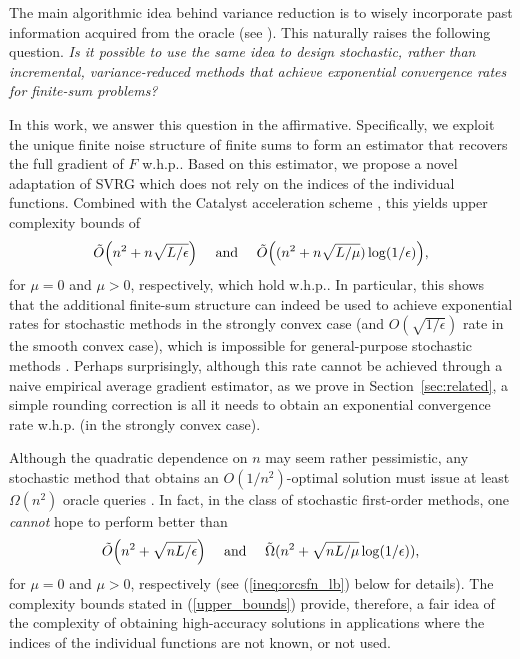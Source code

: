 \documentclass{article}
\theoremstyle{definition}  \newtheorem{exercise}{Exercise}
\theoremstyle{plain}
\DeclarePairedDelimiter{\prn}{(}{)}
\newcommand{\strcvx}{\mu} \newcommand{\query}{B}
\theoremstyle{definition}
\theoremstyle{remark}
\begin{document}
	The main algorithmic idea behind variance reduction is to wisely 
	incorporate past information acquired from the oracle (see 
	\cite{johnson2013accelerating}). This naturally raises the following 
	question. \emph{Is it possible to use the same idea to design stochastic,
	rather than incremental, variance-reduced methods that achieve 
	exponential convergence rates for finite-sum problems? }
	
	In this work, we answer this question in the affirmative. 
	Specifically, we exploit the unique finite noise structure of finite sums 
	to form an estimator that recovers the full gradient of $F$ w.h.p.. 
	Based on this estimator, we propose a novel adaptation of SVRG which 
	does not rely on the indices of the individual functions. Combined with the 
	Catalyst acceleration scheme \cite{lin2015universal}, this yields upper 
	complexity bounds of 
	\begin{align} \label{upper_bounds}
	\tilde{O}\prn*{n^2+n\sqrt{{L}/{\epsilon}}} \quad
	\text{ and } \quad
	\tilde{O}\prn*{(n^2+n\sqrt{L/\strcvx})\log(1/\epsilon)},
	\end{align}
	for $\strcvx=0$ and $\strcvx>0$, respectively, which hold w.h.p..
	In particular, this shows that the additional finite-sum structure 
	can indeed be used to achieve exponential rates for stochastic 
	methods in 	the strongly convex case (and $O(\sqrt{1/\epsilon})$ rate in 
	the smooth convex case), which is impossible for general-purpose 
	stochastic methods 
	\cite{nemirovskyproblem,agarwal2009information,raginsky2011information}.
	Perhaps surprisingly, although this rate cannot be achieved through a 
	naive empirical average gradient estimator, as we prove in 
	Section~\ref{sec:related}, a simple rounding correction is all it needs to 
	obtain an exponential convergence rate w.h.p. (in the strongly convex 
	case). 
	 
	
	Although the quadratic dependence on $n$ may seem rather pessimistic, 
	any stochastic method that obtains an $O(1/n^2)$-optimal solution must issue
	at least $\Omega(n^2)$ oracle queries \cite{arjevani2017limitations}.  
	In fact, in the class of stochastic first-order	methods, one 
	\emph{cannot} hope to 
	perform better than
	\begin{align}
	\tilde{O}\prn*{n^2+\sqrt{{nL}/{\epsilon}}} \quad
	\text{ and } \quad
	\tilde{\Omega}(n^2 + \sqrt{nL/\strcvx}\log(1/\epsilon)),
	\end{align}
	for $\strcvx=0$ and $\strcvx>0$, respectively (see 
	(\ref{ineq:orcsfn_lb}) below for details). The complexity bounds 
	stated in  (\ref{upper_bounds})  provide, therefore, a fair idea of 
	the complexity of obtaining high-accuracy solutions in applications 
	where the indices of the individual functions are not known, or not 
	used. 
	
\end{document}

